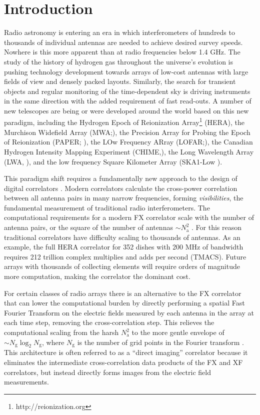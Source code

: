 \documentclass[a4paper,fleqn,usenatbib]{mnras}
\newcommand{\Nant}{N_\textrm{a}}
\newcommand{\Ngrid}{N_\textrm{g}}
\begin{document}
\section{Introduction}

Radio astronomy is entering an era in which interferometers of hundreds to
thousands of individual antennas are needed to achieve desired survey speeds.
Nowhere is this more apparent than at radio frequencies below 1.4 GHz. The study
of the history of hydrogen gas throughout the universe's evolution is pushing
technology development towards arrays of low-cost antennas with large fields of
view and densely packed layouts. Similarly, the search for transient objects
and regular monitoring of the time-dependent sky is driving instruments in the
same direction with the added requirement of fast read-outs. A number of new 
telescopes are being or were developed around the world based on this new 
paradigm, including the Hydrogen Epoch of Reionization 
Array\footnote{http://reionization.org} (HERA), the Murchison Widefield Array 
(MWA;\citealt{tin13,bow13}), the Precision Array for Probing the Epoch of 
Reionization (PAPER; \citealt{par10}), the LOw Frequency ARray 
(LOFAR;\citealt{van13}), the Canadian Hydrogen Intensity Mapping Experiment 
(CHIME,\citealt{ban14}), the Long Wavelength Array (LWA, \citealt{ell13}), and 
the low frequency Square Kilometer Array (SKA1-Low \citealt{mel13}).

This paradigm shift requires a fundamentally new approach to the design of
digital correlators \citep{lon00}. Modern correlators calculate the cross-power
correlation between all antenna pairs in many narrow frequencies, forming
\emph{visibilities}, the fundamental measurement of traditional radio
interferometers. The computational requirements for a modern FX correlator scale
with the number of antenna pairs, or the square of the number of antennas $\sim
\Nant^2$ \citep{bun04}. For this reason traditional correlators have difficulty
scaling to thousands of antennas. As an example, the full HERA correlator for
352 dishes with 200 MHz of bandwidth requires 212 trillion complex multiplies
and adds per second (TMACS). Future arrays with thousands of collecting elements
will require orders of magnitude more computation, making the correlator the
dominant cost.

For certain classes of radio arrays there is an alternative to the FX correlator
that can lower the computational burden by directly performing a spatial Fast
Fourier Transform \citep[FFT;][]{coo65} on the electric fields measured by each 
antenna in the array at each time step, removing the cross-correlation step. 
This relieves the computational scaling from the harsh $\Nant^2$ to the more 
gentle envelope of $\sim\Ngrid\log_2\Ngrid$, where $\Ngrid$ is the number of 
grid points in the Fourier transform \citep[e.g.][]{mor11,teg09,teg10}. This 
architecture is often referred to as a ``direct imaging'' correlator because it 
eliminates the intermediate cross-correlation data products of the FX and XF 
correlators, but instead directly forms images from the electric field 
measurements.
\end{document}
